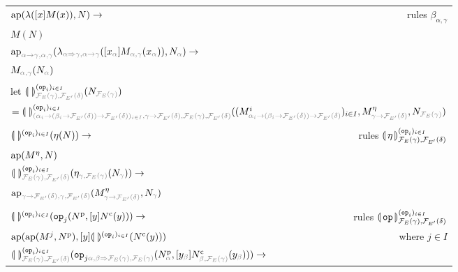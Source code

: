 \begin{sidewaysfigure}
  \centering
  \begin{tabular}{lr}
  $\operatorname{ap}(\lambda([x]M(x)), N) \to$ & rules $\beta_{\alpha,\gamma}$ \\
  $M (N)$ & \\
  \multicolumn{2}{l}{$\aps_{\typehint{\alpha \to \gamma, \alpha, \gamma}}(\lambda_{\typehint{\alpha \To \gamma, \alpha \to \gamma}}([x_{\typehint\alpha}]M_{\typehint{\alpha, \gamma}}(x_{\typehint\alpha})), N_{\typehint\alpha}) \to$} \\
  \multicolumn{2}{l}{$M_{\typehint{\alpha, \gamma}}(N_{\typehint\alpha})$} \\
  \\
  let $\banana{}^{(\op{op}_i)_{i \in
    I}}_{\typehint{\FF_E(\gamma),\FF_{E'}(\delta)}}(N_{\typehint{\FF_E(\gamma)}})$ & \\
  \multicolumn{2}{l}{$ = \banana{}^{(\op{op}_i)_{i \in I}}_{\typehint{(\alpha_i \to (\beta_i \to \FF_{E'}(\delta)) \to
  \FF_{E'}(\delta))_{i \in I}, \gamma \to \FF_{E'}(\delta), \FF_E(\gamma),
  \FF_{E'}(\delta)}} ((M^i_{\typehint{\alpha_i \to (\beta_i \to
    \FF_{E'}(\delta)) \to \FF_{E'}(\delta)}})_{i \in I},
    M^\eta_{\typehint{\gamma \to \FF_{E'}(\delta)}}, N_{\typehint{\FF_E(\gamma)}})$} \\
  \\
  $\llparenthesis \,  \, \rrparenthesis^{(\mathtt{op}_i)_{i \in I}} (\eta (N)) \to$ & rules $\llparenthesis \, \eta \, \rrparenthesis^{(\mathtt{op}_i)_{i \in I}}_{\mathcal{F}_E(\gamma),\mathcal{F}_{E'}(\delta)}$ \\
  $\operatorname{ap}(M^\eta, N)$ & \\
  \multicolumn{2}{l}{$\banana{}^{(\op{op}_i)_{i \in I}}_{\typehint{\FF_E(\gamma), \FF_{E'}(\delta)}} (\eta_{\typehint{\gamma, \FF_E(\gamma)}} (N_{\typehint{\gamma}})) \to$} \\
  \multicolumn{2}{l}{$\aps_{\typehint{\gamma \to \FF_{E'}(\delta), \gamma,
  \FF_{E'}(\delta)}} (M^\eta_{\typehint{\gamma \to \FF_{E'}(\delta)}}, N_{\typehint{\gamma}})$} \\
  \\
  $\llparenthesis \,  \, \rrparenthesis^{(\mathtt{op}_i)_{i \in I}} (\mathtt{op}_j (N^{\mathrm{p}}, [y] N^{\mathrm{c}}(y))) \to$ & rules $\llparenthesis \, \mathtt{op} \, \rrparenthesis^{(\mathtt{op}_i)_{i \in I}}_{\mathcal{F}_E(\gamma),\mathcal{F}_{E'}(\delta)}$ \\
  $\operatorname{ap}(\operatorname{ap}(M^j, N^{\mathrm{p}}), [y] \llparenthesis \,  \, \rrparenthesis^{(\mathtt{op}_i)_{i \in I}} (N^{\mathrm{c}}(y)))$ & where $j \in I$ \\
  \multicolumn{2}{l}{$\banana{}^{(\op{op}_i)_{i \in I}}_{\typehint{\FF_E(\gamma), \FF_{E'}(\delta)}} (\op{op}_{j \typehint{\alpha, \beta \To \FF_E(\gamma), \FF_E(\gamma)}} (N^{\mathrm{p}}_{\typehint{\alpha}}, [y_{\typehint{\beta}}] N^{\mathrm{c}}_{\typehint{\beta, \FF_E(\gamma)}}(y_{\typehint{\beta}}))) \to$} \\

\end{tabular}
\end{sidewaysfigure}
